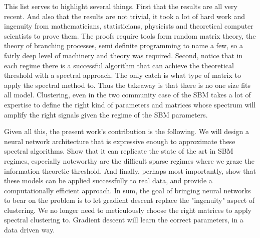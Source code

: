 This list serves to highlight several things.  First that the results are all very recent. And also that the results are not trivial, it took a lot of hard work and ingenuity from mathematicians, statisticians, physicists and theoretical computer scientists to prove them.  The proofs require tools form random matrix theory, the theory of branching processes, semi definite programming to name a few, so a fairly deep level of machinery and theory was required. Second, notice that in each regime there is a successful algorithm that can achieve the theoretical threshold with a spectral approach.  The only catch is what type of matrix to apply the spectral method to.  Thus the takeaway is that there is no one size fits all model. Clustering, even in the two community case of the SBM takes a lot of expertise to define the right kind of parameters and matrices whose spectrum will amplify the right signals given the regime of the SBM parameters.  

Given all this, the present work's contribution is the following.  We will design a neural network architecture that is expressive enough to approximate these spectral algorithms.  Show that it can replicate the state of the art in SBM regimes, especially noteworthy are the difficult sparse regimes where we graze the information theoretic threshold.  And finally, perhaps most importantly, show that these models can be applied successfully to real data, and provide a computationally efficient approach.  In sum, the goal of bringing neural networks to bear on the problem is to let gradient descent replace the "ingenuity" aspect of clustering.  We no longer need to meticulously choose the right matrices to apply spectral clustering to.  Gradient descent will learn the correct parameters, in a data driven way. 
